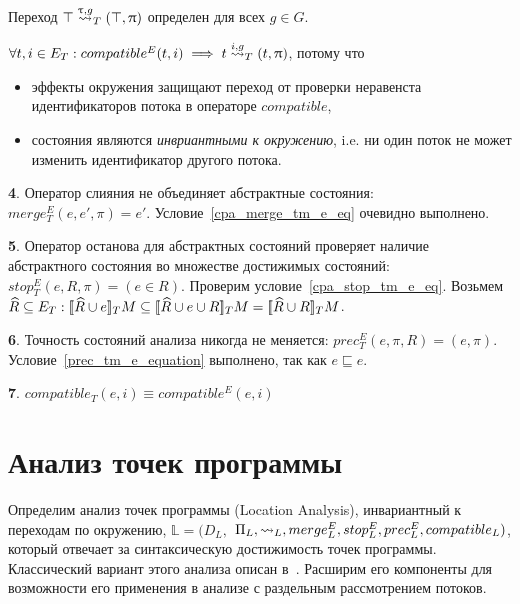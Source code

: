 Переход $\top \stackrel{\uptau, g}{\leadsto}_T (\top, \uppi)$ определен для всех $g\in G$.

$\forall t,i \in E_T: compatible^E(t,i) \implies t \stackrel{i, g}{\leadsto}_T (t, \uppi)$, потому что 
\begin{itemize}
\item эффекты окружения защищают переход от проверки неравенста идентификаторов потока в операторе $compatible$,
\item состояния являются {\em инвриантными к окружению}, i.e. ни один поток не может изменить идентификатор другого потока.
\end{itemize}

{\textbf 4.} Оператор слияния не объединяет абстрактные состояния: $merge^E_T(e, e', \pi) = e'$. Условие~\ref{cpa_merge_tm_e_eq} очевидно выполнено.

{\textbf 5.} Оператор останова для абстрактных состояний проверяет наличие абстрактного состояния во множестве достижимых состояний: $stop^E_T(e, R, \pi) = (e \in R)$.
Проверим условие~\ref{cpa_stop_tm_e_eq}.
Возьмем $\widehat{R} \subseteq E_T: [\![ \widehat{R} \cup e ]\!]_TM \subseteq [\![ \widehat{R} \cup e \cup R ]\!]_TM = [\![ \widehat{R} \cup R ]\!]_TM$.

{\textbf 6.} Точность состояний анализа никогда не меняется: $prec^E_T(e, \pi, R) = (e, \pi)$. Условие~\ref{prec_tm_e_equation} выполнено, так как $e \sqsubseteq e$.

{\textbf 7.} $compatible_T(e,i) \equiv compatible^E(e,i)$

\section{Анализ точек программы}
\label{sect_location_analysis}

Определим анализ точек программы (Location Analysis), инвариантный к переходам по окружению,
$\mathbb{L}=(D_{L},$ $\Pi_{L}, \leadsto_{L}, merge^E_{L}, stop^E_{L}, prec^E_{L}, compatible_{L})$, который отвечает за синтаксическую достижимость точек программы.
Классический вариант этого анализа описан в~\cite{Beyer08}.
Расширим его компоненты для возможности его применения в анализе с раздельным рассмотрением потоков.
 
